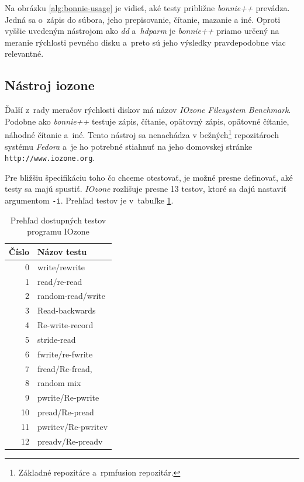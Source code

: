 Na obrázku \ref{alg:bonnie-usage} je vidieť, aké testy približne \emph{bonnie++}
prevádza. Jedná sa o~zápis do súbora, jeho prepisovanie, čítanie, mazanie a
iné. Oproti vyššie uvedeným nástrojom ako \emph{dd} a~\emph{hdparm} je
\emph{bonnie++} priamo určený na meranie rýchlosti pevného disku a~preto sú
jeho výsledky pravdepodobne viac relevantné.

%
%

\subsection*{Nástroj iozone}

Ďalší z~rady meračov rýchlosti diskov má názov \emph{IOzone Filesystem
Benchmark}. Podobne ako \emph{bonnie++} testuje zápis, čítanie, opätovný zápis,
opätovné čítanie, náhodné čítanie a~iné. Tento nástroj sa nenachádza v
bežných\footnote{Základné repozitáre a~rpmfusion repozitár.} repozitároch
systému \emph{Fedora} a~je ho potrebné stiahnuť na jeho domovskej stránke
\texttt{http://www.iozone.org}.

Pre bližšiu špecifikáciu toho čo chceme otestovať, je možné presne definovať,
aké testy sa majú spustiť. \emph{IOzone} rozlišuje presne 13 testov, ktoré sa
dajú nastaviť argumentom \texttt{-i}. Prehľad testov je v~tabuľke
\ref{tab:iozone-tests}.

\begin{table}[H]
\begin{center}
\begin{tabular}{|r|l|}
    \hline
    \textbf{Číslo} & \textbf{Názov testu} \\
    \hline
    0 & write/rewrite \\
    1 & read/re-read \\
    2 & random-read/write \\
    3 & Read-backwards \\
    4 & Re-write-record \\
    5 & stride-read \\
    6 & fwrite/re-fwrite \\
    7 & fread/Re-fread, \\
    8 & random mix \\
    9 & pwrite/Re-pwrite \\
    10 & pread/Re-pread \\
    11 & pwritev/Re-pwritev \\
    12 & preadv/Re-preadv \\
    \hline
\end{tabular}
\caption{Prehľad dostupných testov programu IOzone}
\label{tab:iozone-tests}
\end{center}
\end{table}

